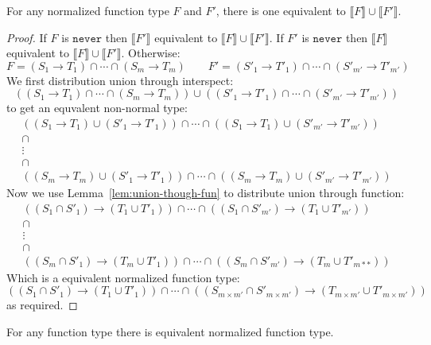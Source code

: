 \documentclass[acmsmall,review,screen]{acmart}
\newcommand{\NEVER}{\mathtt{never}}
\newcommand{\fun}{\mathbin{\rightarrow}}
\newcommand{\sem}[1]{\llbracket{#1}\rrbracket}
\begin{document}
\begin{lemma} \label{lem:funun}
  For any normalized function type $F$ and $F'$,
  there is one equivalent to
  $\sem{F} \cup \sem{F'}$.
\end{lemma}

\begin{proof}
  If $F$ is $\NEVER$ then $\sem{F'}$ equivalent to $\sem{F} \cup \sem{F'}$.
  If $F'$ is $\NEVER$ then $\sem{F}$ equivalent to $\sem{F} \cup \sem{F'}$.
  Otherwise:
  \[
    F = (S_1 \fun T_1) \cap \cdots \cap (S_{m} \fun T_{m})
  \qquad
    F' = (S'_1 \fun T'_1) \cap \cdots \cap (S'_{m'} \fun T'_{m'})
  \]
  We first distribution union through interspect:
  \[
    ((S_1 \fun T_1) \cap \cdots \cap (S_{m} \fun T_{m}))
    \cup
    ((S'_1 \fun T'_1) \cap \cdots \cap (S'_{m'} \fun T'_{m'}))
  \]
  to get an equvalent non-normal type:
  \[\begin{array}{c}
    ((S_{1} \fun T_{1}) \cup (S'_{1} \fun T'_{1}))
    \cap \cdots \cap
    ((S_{1} \fun T_{1}) \cup (S'_{m'} \fun T'_{m'}))
    \\
    \cap
    \\
    \vdots
    \\
    \cap
    \\
    ((S_{m} \fun T_{m}) \cup (S'_{1} \fun T'_{1}))
    \cap \cdots \cap
    ((S_{m} \fun T_{m}) \cup (S'_{m'} \fun T'_{m'}))
  \end{array}\]
  Now we use Lemma~\ref{lem:union-though-fun} to distribute union through function:
  \[\begin{array}{c}
    ((S_{1} \cap S'_{1}) \fun (T_{1} \cup T'_{1}))
    \cap \cdots \cap
    ((S_{1} \cap S'_{m'}) \fun (T_{1} \cup T'_{m'}))
    \\
    \cap
    \\
    \vdots
    \\
    \cap
    \\
    ((S_{m} \cap S'_{1}) \fun (T_{m} \cup T'_{1}))
    \cap \cdots \cap
    ((S_{m} \cap S'_{m'}) \fun (T_{m} \cup T'_{m**}))
  \end{array}\]
  Which is a equivalent normalized function type:
  \[
    ((S_{1} \cap S'_{1}) \fun (T_{1} \cup T'_{1}))
    \cap \cdots \cap
    ((S_{m \times m'} \cap S'_{m \times m'}) \fun (T_{m \times m'} \cup T'_{m \times m'}))
  \]
  as required.
\end{proof}

\begin{lemma} \label{lem:funnord}
  For any function type there is equivalent normalized function type.
\end{lemma}
\end{document}
